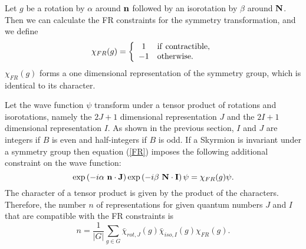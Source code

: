 \documentclass[a4paper,12pt]{article}
\begin{document}
Let $g$ be a rotation by $\alpha$ around ${\bf n}$ followed by an 
isorotation by $\beta$ around ${\bf N}$. Then we can calculate the FR 
constraints for the symmetry transformation, and we define
%
\begin{equation}
\chi_{FR}(g) = \left\{
\begin{array}{cl}
1 & {\rm if\ }  {\rm contractible}, \\
-1& {\rm otherwise}.
\end{array}
\right.
\end{equation}
%
$\chi_{FR}(g)$ forms a one dimensional representation of the symmetry 
group, which is identical to its character.

Let the wave function $\psi$ transform under a tensor 
product of rotations and isorotations, namely
the $2J+1$ dimensional representation $J$ 
and the $2I+1$ dimensional representation $I$. As shown in the 
previous section, $I$ and $J$ are integers if $B$ is even and 
half-integers if $B$ is odd. If a Skyrmion is invariant under a symmetry 
group then equation (\ref{FR}) imposes the following additional 
constraint on the wave function:
%
\begin{equation}
\exp\left( -i \alpha\ {\bf n} \cdot {\bf J} \right)
\exp\left( -i \beta\ {\bf N} \cdot {\bf I} \right)
\psi = \chi_{FR}(g) \psi.
\end{equation}
%
The character of a tensor product is given by the product of the 
characters. Therefore, the number $n$ of representations for given quantum 
numbers $J$ and $I$ that are compatible with the FR constraints is 
%
\begin{equation}
\label{chiFR}
n = \frac{1}{|G|} \sum \limits_{g \in G} 
{\bar \chi}_{rot,J}(g) {\bar \chi}_{iso,I}(g) \chi_{FR}(g).
\end{equation}
\end{document}
